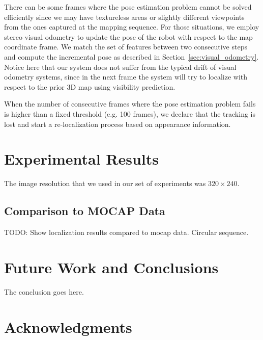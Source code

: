\documentclass[conference]{IEEEtran}
\begin{document}
There can be some frames where the pose estimation problem cannot be solved efficiently since we may have textureless areas or slightly different viewpoints from the ones captured at the mapping sequence. For those situations, we employ stereo visual odometry to update the pose of the robot with respect to the map coordinate frame. We match the set of features between two consecutive steps and compute the incremental pose as described in Section~\ref{sec:visual_odometry}. Notice here that our system does not suffer from the typical drift of visual odometry systems, since in the next frame the system will try to localize with respect to the prior 3D map using visibility prediction. 

When the number of consecutive frames where the pose estimation problem fails is higher than a fixed threshold (e.g. 100 frames), we declare that the tracking is lost and start a re-localization process based on appearance information.

\section{Experimental Results}\label{sec:results}
The image resolution that we used in our set of experiments was $320 \times 240$.


\subsection{Comparison to MOCAP Data}\label{sec:mocap}
TODO: Show localization results compared to mocap data. Circular sequence.

\section{Future Work and Conclusions}\label{sec:conclusions}

The conclusion goes here.

\section*{Acknowledgments}



\end{document}
